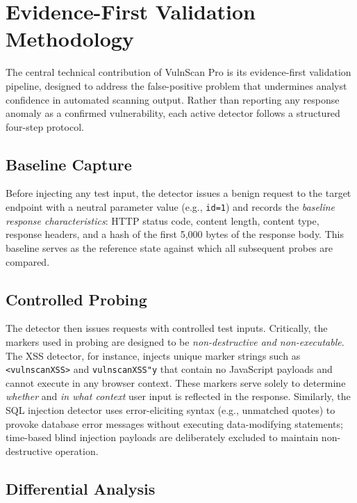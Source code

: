 \documentclass[conference]{IEEEtran}
\begin{document}
\section{Evidence-First Validation Methodology}

The central technical contribution of VulnScan Pro is its evidence-first validation pipeline, designed to address the false-positive problem that undermines analyst confidence in automated scanning output. Rather than reporting any response anomaly as a confirmed vulnerability, each active detector follows a structured four-step protocol.

\subsection{Baseline Capture}

Before injecting any test input, the detector issues a benign request to the target endpoint with a neutral parameter value (e.g., \texttt{id=1}) and records the \textit{baseline response characteristics}: HTTP status code, content length, content type, response headers, and a hash of the first 5,000 bytes of the response body. This baseline serves as the reference state against which all subsequent probes are compared.

\subsection{Controlled Probing}

The detector then issues requests with controlled test inputs. Critically, the markers used in probing are designed to be \textit{non-destructive and non-executable}. The XSS detector, for instance, injects unique marker strings such as \texttt{<vulnscanXSS>} and \texttt{vulnscanXSS"y} that contain no JavaScript payloads and cannot execute in any browser context. These markers serve solely to determine \textit{whether} and \textit{in what context} user input is reflected in the response. Similarly, the SQL injection detector uses error-eliciting syntax (e.g., unmatched quotes) to provoke database error messages without executing data-modifying statements; time-based blind injection payloads are deliberately excluded to maintain non-destructive operation.

\subsection{Differential Analysis}
\end{document}
